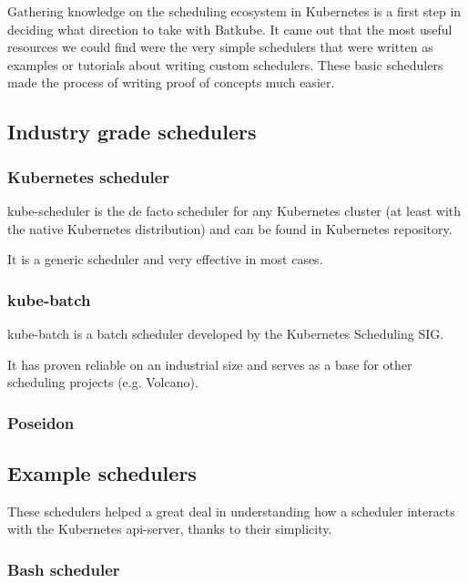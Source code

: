 \documentclass[12pt]{report}
\begin{document}
Gathering knowledge on the scheduling ecosystem in Kubernetes is a first step
in deciding what direction to take with Batkube. It came out that the most
useful resources we could find were the very simple schedulers that were
written as examples or tutorials about writing custom schedulers. These basic
schedulers made the process of writing proof of concepts much easier.


\subsection{Industry grade schedulers}

\subsubsection{Kubernetes scheduler}

kube-scheduler is the de facto scheduler for any Kubernetes
cluster (at least with the native Kubernetes distribution) and can be found in
Kubernetes repository\cite{kube-repo}.

It is a generic scheduler and very effective in most cases.

\subsubsection{kube-batch}

kube-batch\cite{kube-batch} is a batch scheduler developed by the Kubernetes
Scheduling SIG\cite{scheduling-sig}.

It has proven reliable on an industrial size and serves as a base for other scheduling projects (e.g. Volcano\cite{volcano}).

\subsubsection{Poseidon}

\subsection{Example schedulers}

These schedulers helped a great deal in understanding how a scheduler interacts
with the Kubernetes api-server, thanks to their simplicity.

\subsubsection{Bash scheduler}
\end{document}
